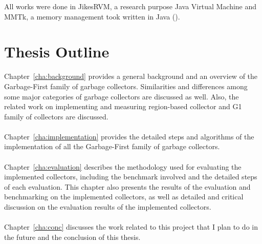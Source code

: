 All works were done in JikesRVM, a research purpose Java Virtual Machine and MMTk,
a memory management took written in Java (\cite{blackburn2004oil}).

\section{Thesis Outline}

Chapter~\ref{cha:background}
provides a general background and an overview of the Garbage-First family of garbage collectors.
Similarities and differences among some major categories of garbage collectors are discussed as well.
Also, the related work on implementing and measuring region-based collector and G1 family
of collectors are discussed.
\\\\
Chapter~\ref{cha:implementation} provides the detailed steps and algorithms of the implementation of
all the Garbage-First family of garbage collectors.
\\\\
Chapter~\ref{cha:evaluation}
describes the methodology used for evaluating the implemented collectors,
including the benchmark involved and the detailed steps of each evaluation.
This chapter also presents the results of the evaluation and benchmarking on the implemented collectors,
as well as detailed and critical discussion on the evaluation results of the
implemented collectors.
\\\\
Chapter~\ref{cha:conc} discusses the work related to this project that I plan to do in the future and the conclusion of this thesis.